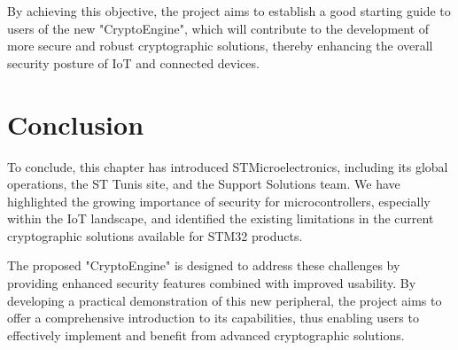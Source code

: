 By achieving this objective, the project aims to establish a good starting guide to users of the new "CryptoEngine", which will contribute to the development of more secure and robust cryptographic solutions, thereby enhancing the overall security posture of IoT and connected devices.

\section{Conclusion}

To conclude, this chapter has introduced STMicroelectronics, including its global operations, the ST Tunis site, and the Support Solutions team. We have highlighted the growing importance of security for microcontrollers, especially within the IoT landscape, and identified the existing limitations in the current cryptographic solutions available for STM32 products.

The proposed "CryptoEngine" is designed to address these challenges by providing enhanced security features combined with improved usability. By developing a practical demonstration of this new peripheral, the project aims to offer a comprehensive introduction to its capabilities, thus enabling users to effectively implement and benefit from advanced cryptographic solutions.
